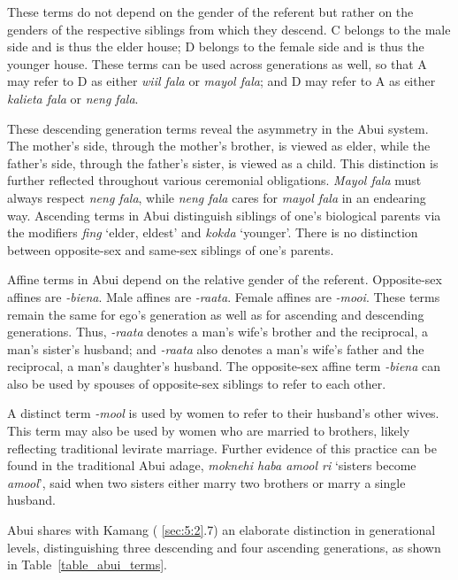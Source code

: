 These terms do not depend on the gender of the referent but rather on the genders of the respective siblings from which they descend. C belongs to the male side and is thus the elder house; D belongs to the female side and is thus the younger house. These terms can be used across generations as well, so that A may refer to D as either \textit{wiil fala} or \textit{mayol fala}; and D may refer to A as either \textit{kalieta fala} or \textit{neng fala}.

These descending generation terms reveal the asymmetry in the Abui system. The mother's side, through the mother's brother, is viewed as elder, while the father's side, through the father's sister, is viewed as a child. This distinction is further reflected throughout various ceremonial obligations. \textit{Mayol fala} must always respect \textit{neng fala}, while \textit{neng fala} cares for \textit{mayol fala} in an endearing way. Ascending terms in Abui distinguish siblings of one's biological parents via the modifiers \textit{fing} `elder, eldest' and \textit{kokda} `younger'. There is no distinction between opposite-sex and same-sex siblings of one's parents.

Affine terms in Abui depend on the relative gender of the referent. Opposite-sex affines are \textit{-biena}. Male affines are \textit{-raata}. Female affines are \textit{-mooi}. These terms remain the same for ego's generation as well as for ascending and descending generations. Thus, \textit{-raata} denotes a man's wife's brother and the reciprocal, a man's sister's husband; and \textit{-raata} also denotes a man's wife's father and the reciprocal, a man's daughter's husband. The opposite-sex affine term \textit{-biena} can also be used by spouses of opposite-sex siblings to refer to each other. 

A distinct term \textit{-mool} is used by women to refer to their husband's other wives. This term may also be used by women who are married to brothers, likely reflecting traditional levirate marriage. Further evidence of this practice can be found in the traditional Abui adage, \textit{moknehi haba amool ri} `sisters become \textit{amool}', said when two sisters either marry two brothers or marry a single husband. 

Abui shares with Kamang ({\SS} \ref{sec:5:2}.7) an elaborate distinction in generational levels, distinguishing three descending and four ascending generations, as shown in Table~\ref{table_abui_terms}.

